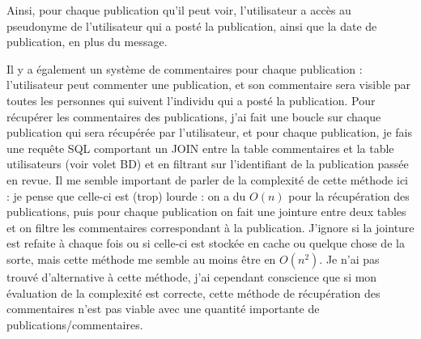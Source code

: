 \documentclass{article}
\begin{document}
Ainsi, pour chaque publication qu'il peut voir, l'utilisateur a accès au pseudonyme de l'utilisateur qui a posté la publication, ainsi que la date de publication, en plus du message.

Il y a également un système de commentaires pour chaque publication : l'utilisateur peut commenter une publication, et son commentaire sera visible par toutes les personnes qui suivent l'individu qui a posté la publication. Pour récupérer les commentaires des publications, j'ai fait une boucle sur chaque publication qui sera récupérée par l'utilisateur, et pour chaque publication, je fais une requête SQL comportant un JOIN entre la table commentaires et la table utilisateurs (voir volet BD) et en filtrant sur l'identifiant de la publication passée en revue. Il me semble important de parler de la complexité de cette méthode ici : je pense que celle-ci est (trop) lourde : on a du \begin{math}O(n)\end{math} pour la récupération des publications, puis pour chaque publication on fait une jointure entre deux tables et on filtre les commentaires correspondant à la publication. J'ignore si la jointure est refaite à chaque fois ou si celle-ci est stockée en cache ou quelque chose de la sorte, mais cette méthode me semble au moins être en \begin{math}O(n^2)\end{math}. Je n'ai pas trouvé d'alternative à cette méthode, j'ai cependant conscience que si mon évaluation de la complexité est correcte, cette méthode de récupération des commentaires n'est pas viable avec une quantité importante de publications/commentaires.
\end{document}
